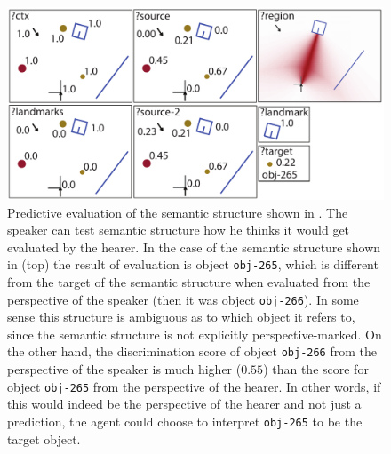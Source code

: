 \begin{figure}
\begin{center}
\includegraphics[width=.8\columnwidth]{figs/semantic-structure-in-front-of-the-box-relative-evaluation-prediction-hearer}
\end{center}
\caption[Predictive evaluation from the perspective of the hearer]
{Predictive evaluation of the semantic structure shown in . The speaker can test semantic structure how he thinks it 
would get evaluated by the hearer. In the case of the semantic structure shown
in  (top) the result of evaluation is object {\footnotesize\tt obj-265},
which is different from the target of the semantic structure when evaluated
from the perspective of the speaker (then it was object {\footnotesize\tt obj-266}).
In some sense this structure is ambiguous as to which object it refers to,
since the semantic structure is not explicitly perspective-marked.
On the other hand, the discrimination score of object {\footnotesize\tt obj-266} 
from the perspective of the
speaker is much higher ($0.55$) than the score for object {\footnotesize\tt obj-265} 
from the perspective of the hearer. In other words, if this would indeed be
the perspective of the hearer and not just a prediction, the agent could
choose to interpret {\footnotesize\tt obj-265} to be the target object.}
\label{f:predictiv-evaluation}
\end{figure}

